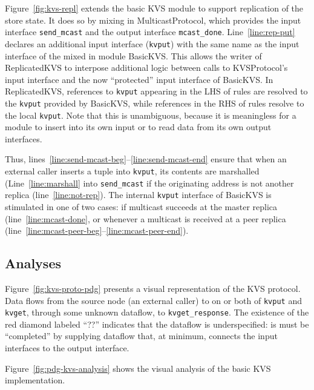 Figure~\ref{fig:kvs-repl} extends the basic KVS module to support replication of the store
state.  It does so by mixing in MulticastProtocol, which provides the input interface 
\texttt{send\_mcast} and the output interface \texttt{mcast\_done}.  Line~\ref{line:rep-put}
declares an additional input interface (\texttt{kvput}) with the same name as the input
interface of the mixed in module BasicKVS.  This allows the writer of ReplicatedKVS to 
interpose additional logic between calls to KVSProtocol's input interface and the now 
``protected'' input interface of BasicKVS.  In ReplicatedKVS, references to \texttt{kvput}
appearing in the LHS of rules are resolved to the \texttt{kvput} provided by BasicKVS, 
while references in the RHS of rules resolve to the local \texttt{kvput}.
Note that this is unambiguous, because it is meaningless for a module to insert into its own input or to read data from its own output interfaces.

Thus, lines~\ref{line:send-mcast-beg}--\ref{line:send-mcast-end} ensure that when an external caller inserts a tuple into
\texttt{kvput}, its contents are marshalled (Line~\ref{line:marshall} into \texttt{send\_mcast}
if the originating address is not another replica (line~\ref{line:not-rep}).  The internal
\texttt{kvput} interface of BasicKVS is stimulated in one of two cases: if multicast succeeds
at the master replica (line~\ref{line:mcast-done}, or whenever a multicast is received at 
a peer replica (line~\ref{line:mcast-peer-beg}--\ref{line:mcast-peer-end}).

\subsection{Analyses}


Figure~\ref{fig:kvs-proto-pdg} presents a visual representation of the KVS protocol.  Data
flows from the source node (an external caller) to on or both of \texttt{kvput} and 
\texttt{kvget}, through some unknown dataflow, to \texttt{kvget\_response}.
The existence of the red diamond labeled ``??'' indicates that the dataflow is underspecified:
is must be ``completed'' by supplying dataflow that, at minimum, connects the input 
interfaces to the output interface.

Figure~\ref{fig:pdg-kvs-analysis} shows the visual analysis of the basic KVS implementation.




